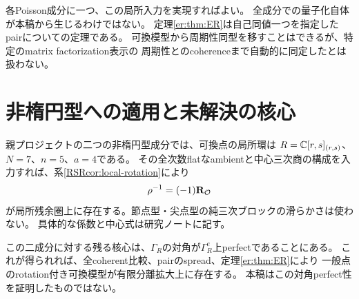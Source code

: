 \begin{remark}[残る仮定の量化]
各Poisson成分に一つ、この局所入力を実現すればよい。
全成分での量子化自体が本稿から生じるわけではない。
定理\ref{er:thm:ER}は自己同値一つを指定したpairについての定理である。
可換模型から周期性同型を移すことはできるが、特定のmatrix factorization表示の
周期性とのcoherenceまで自動的に同定したとは扱わない。
\end{remark}

\section{非楕円型への適用と未解決の核心}\label{RSRsec:remaining}
親プロジェクトの二つの非楕円型成分では、可換点の局所環は
$R=\mathbb C[r,s]_{(r,s)}$、$N=7$、$n=5$、$a=4$である。
その全次数flatなambientと中心三次商の構成を入力すれば、系\ref{RSRcor:local-rotation}により
\[
 \rho^{-1}=(-1)\mathbf R_{\mathcal O}
\]
が局所残余圏上に存在する。節点型・尖点型の純三次ブロックの滑らかさは使わない。
具体的な係数と中心式は研究ノートに記す。

この二成分に対する残る核心は、$\Gamma_R$の対角が$\Gamma_R^e$上perfectであることにある。
これが得られれば、全coherent比較、pairのspread、定理\ref{er:thm:ER}により
一般点のrotation付き可換模型が有限分離拡大上に存在する。
本稿はこの対角perfect性を証明したものではない。

